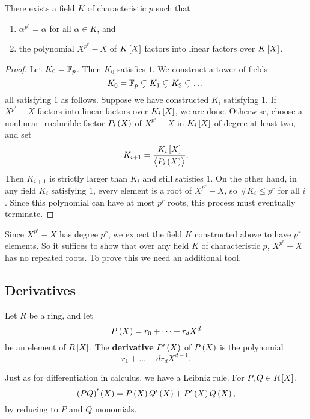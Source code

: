 \pagebreak

\begin{corollary}
There exists a field $ K $ of characteristic $ p $ such that
\begin{enumerate}
\item $ \alpha^{p^r} = \alpha $ for all $ \alpha \in K $, and
\item the polynomial $ X^{p^r} - X $ of $ K\sbr{X} $ factors into linear factors over $ K\sbr{X} $.
\end{enumerate}
\end{corollary}

\begin{proof}
Let $ K_0 = \mathbb{F}_p $. Then $ K_0 $ satisfies $ 1 $. We construct a tower of fields
$$ K_0 = \mathbb{F}_p \subsetneq K_1 \subsetneq K_2 \subsetneq \dots $$
all satisfying $ 1 $ as follows. Suppose we have constructed $ K_i $ satisfying $ 1 $. If $ X^{p^r} - X $ factors into linear factors over $ K_i\sbr{X} $, we are done. Otherwise, choose a nonlinear irreducible factor $ P_i\br{X} $ of $ X^{p^r} - X $ in $ K_i\sbr{X} $ of degree at least two, and set
$$ K_{i + 1} = \dfrac{K_i\sbr{X}}{\abr{P_i\br{X}}}. $$
Then $ K_{i + 1} $ is strictly larger than $ K_i $ and still satisfies $ 1 $. On the other hand, in any field $ K_i $ satisfying $ 1 $, every element is a root of $ X^{p^r} - X $, so $ \#K_i \le p^r $ for all $ i $. Since this polynomial can have at most $ p^r $ roots, this process must eventually terminate.
\end{proof}

Since $ X^{p^r} - X $ has degree $ p^r $, we expect the field $ K $ constructed above to have $ p^r $ elements. So it suffices to show that over any field $ K $ of characteristic $ p $, $ X^{p^r} - X $ has no repeated roots. To prove this we need an additional tool.

\subsection{Derivatives}

\begin{definition}
Let $ R $ be a ring, and let
$$ P\br{X} = r_0 + \dots + r_dX^d $$
be an element of $ R\sbr{X} $. The \textbf{derivative} $ P'\br{X} $ of $ P\br{X} $ is the polynomial
$$ r_1 + \dots + dr_dX^{d - 1}. $$
\end{definition}

\begin{note*}
Just as for differentiation in calculus, we have a Leibniz rule. For $ P, Q \in R\sbr{X} $,
$$ \br{PQ}'\br{X} = P\br{X}Q'\br{X} + P'\br{X}Q\br{X}, $$
by reducing to $ P $ and $ Q $ monomials.
\end{note*}

